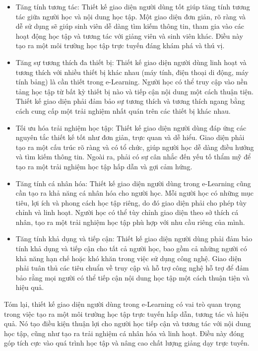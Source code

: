 \documentclass[../Thesis.tex]{subfiles}
\begin{document}
\begin{itemize}[label=$\bullet$]
	\item Tăng tính tương tác: Thiết kế giao diện người dùng tốt giúp tăng tính tương tác giữa người học và nội dung học tập. Một giao diện đơn giản, rõ ràng và dễ sử dụng sẽ giúp sinh viên dễ dàng tìm kiếm thông tin, tham gia vào các hoạt động học tập và tương tác với giảng viên và sinh viên khác. Điều này tạo ra một môi trường học tập trực tuyến đáng khám phá và thú vị.

	\item Tăng sự tương thích đa thiết bị: Thiết kế giao diện người dùng linh hoạt và tương thích với nhiều thiết bị khác nhau (máy tính, điện thoại di động, máy tính bảng) là cần thiết trong e-Learning. Người học có thể truy cập vào nền tảng học tập từ bất kỳ thiết bị nào và tiếp cận nội dung một cách thuận tiện. Thiết kế giao diện phải đảm bảo sự tương thích và tương thích ngang bằng cách cung cấp một trải nghiệm nhất quán trên các thiết bị khác nhau.

	\item Tối ưu hóa trải nghiệm học tập: Thiết kế giao diện người dùng đáp ứng các nguyên tắc thiết kế tốt như đơn giản, trực quan và dễ hiểu. Giao diện phải tạo ra một cấu trúc rõ ràng và có tổ chức, giúp người học dễ dàng điều hướng và tìm kiếm thông tin. Ngoài ra, phải có sự cân nhắc đến yếu tố thẩm mỹ để tạo ra một trải nghiệm học tập hấp dẫn và gợi cảm hứng.

	\item Tăng tính cá nhân hóa: Thiết kế giao diện người dùng trong e-Learning cũng cần tạo ra khả năng cá nhân hóa cho người học. Mỗi người học có những mục tiêu, lợi ích và phong cách học tập riêng, do đó giao diện phải cho phép tùy chỉnh và linh hoạt. Người học có thể tùy chỉnh giao diện theo sở thích cá nhân, tạo ra một trải nghiệm học tập phù hợp với nhu cầu riêng của mình.

	\item Tăng tính khả dụng và tiếp cận: Thiết kế giao diện người dùng phải đảm bảo tính khả dụng và tiếp cận cho tất cả người học, bao gồm cả những người có khả năng hạn chế hoặc khó khăn trong việc sử dụng công nghệ. Giao diện phải tuân thủ các tiêu chuẩn về truy cập và hỗ trợ công nghệ hỗ trợ để đảm bảo rằng mọi người có thể tiếp cận nội dung học tập một cách thuận tiện và hiệu quả.
\end{itemize}
Tóm lại, thiết kế giao diện người dùng trong e-Learning có vai trò quan trọng trong việc tạo ra một môi trường học tập trực tuyến hấp dẫn, tương tác và hiệu quả. Nó tạo điều kiện thuận lợi cho người học tiếp cận và tương tác với nội dung học tập, cũng như tạo ra trải nghiệm cá nhân hóa và linh hoạt. Điều này đóng góp tích cực vào quá trình học tập và nâng cao chất lượng giảng dạy trực tuyến.
\end{document}
